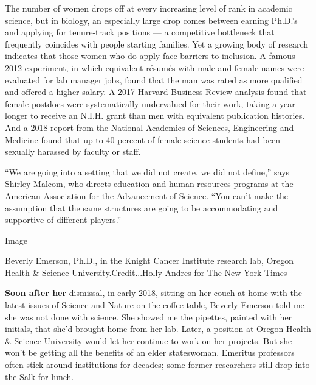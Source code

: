 The number of women drops off at every increasing level of rank in
academic science, but in biology, an especially large drop comes between
earning Ph.D.'s and applying for tenure-track positions --- a
competitive bottleneck that frequently coincides with people starting
families. Yet a growing body of research indicates that those women who
do apply face barriers to inclusion. A
\href{https://www.pnas.org/content/109/41/16474}{famous 2012
experiment}, in which equivalent résumés with male and female names were
evaluated for lab manager jobs, found that the man was rated as more
qualified and offered a higher salary. A
\href{https://hbr.org/2017/03/research-junior-female-scientists-arent-getting-the-credit-they-deserve}{2017
Harvard Business Review analysis} found that female postdocs were
systematically undervalued for their work, taking a year longer to
receive an N.I.H. grant than men with equivalent publication histories.
And
\href{https://www.nap.edu/catalog/24994/sexual-harassment-of-women-climate-culture-and-consequences-in-academic}{a
2018 report} from the National Academies of Sciences, Engineering and
Medicine found that up to 40 percent of female science students had been
sexually harassed by faculty or staff.

``We are going into a setting that we did not create, we did not
define,'' says Shirley Malcom, who directs education and human resources
programs at the American Association for the Advancement of Science.
``You can't make the assumption that the same structures are going to be
accommodating and supportive of different players.''

Image

Beverly Emerson, Ph.D., in the Knight Cancer Institute research lab,
Oregon Health \& Science University.Credit...Holly Andres for The New
York Times

\textbf{Soon after her} dismissal, in early 2018, sitting on her couch
at home with the latest issues of Science and Nature on the coffee
table, Beverly Emerson told me she was not done with science. She showed
me the pipettes, painted with her initials, that she'd brought home from
her lab. Later, a position at Oregon Health \& Science University would
let her continue to work on her projects. But she won't be getting all
the benefits of an elder stateswoman. Emeritus professors often stick
around institutions for decades; some former researchers still drop into
the Salk for lunch.

